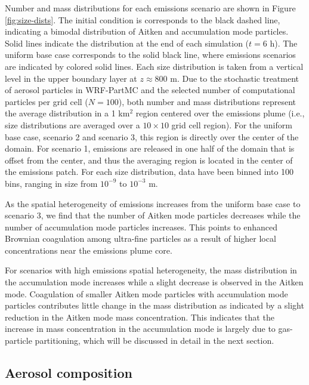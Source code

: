 \documentclass[journal abbreviation, manuscript]{copernicus}
\begin{document}
Number and mass distributions for each emissions scenario are shown in Figure \ref{fig:size-dists}. The initial condition is corresponds to the black dashed line, indicating a bimodal distribution of Aitken and accumulation mode particles. Solid lines indicate the distribution at the end of each simulation ($t=6$ h). The uniform base case corresponds to the solid black line, where emissions scenarios are indicated by colored solid lines.  Each size distribution is taken from a vertical level in the upper boundary layer at $z\approx800$ m. Due to the stochastic treatment of aerosol particles in WRF-PartMC and the selected number of computational particles per grid cell ($N = 100$), both number and mass distributions represent the average distribution in a 1 km$^2$ region centered over the emissions plume (i.e., size distributions are averaged over a $10\times10$ grid cell region). For the uniform base case, scenario 2 and scenario 3, this region is directly over the center of the domain. For scenario 1, emissions are released in one half of the domain that is offset from the center, and thus the averaging region is located in the center of the emissions patch. For each size distribution, data have been binned into 100 bins, ranging in size from $10^{-9}$ to $10^{-3}$ m. 

As the spatial heterogeneity of emissions increases from the uniform base case to scenario 3, we find that the number of Aitken mode particles decreases while the number of accumulation mode particles increases. This points to enhanced Brownian coagulation among ultra-fine particles as a result of higher local concentrations near the emissions plume core. 

For scenarios with high emissions spatial heterogeneity, the mass distribution in the accumulation mode increases while a slight decrease is observed in the Aitken mode. Coagulation of smaller Aitken mode particles with accumulation mode particles contributes little change in the mass distribution as indicated by a slight reduction in the Aitken mode mass concentration. This indicates that the increase in mass concentration in the accumulation mode is largely due to gas-particle partitioning, which will be discussed in detail in the next section.

\subsection{Aerosol composition}
\end{document}

